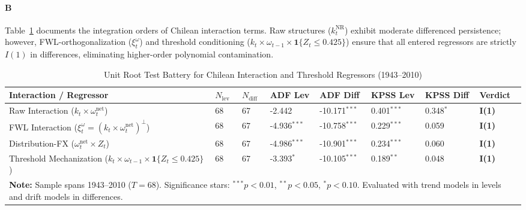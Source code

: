 \paragraph{B}
Table~\ref{tab:chile_urca_interactions} documents the integration orders of Chilean interaction terms. Raw structures ($k^{\text{NR}}_t$) exhibit moderate differenced persistence; however, FWL-orthogonalization ($\xi^{\omega}_t$) and threshold conditioning ($k_t \times \omega_{t-1} \times \mathbf{1}\{Z_t \le 0.425\}$) ensure that all entered regressors are strictly $I(1)$ in differences, eliminating higher-order polynomial contamination.

\begin{table}[h!]
\centering
\footnotesize
\setlength{\tabcolsep}{3pt}
\caption{Unit Root Test Battery for Chilean Interaction and Threshold Regressors (1943--2010)}
\label{tab:chile_urca_interactions}
\begin{tabular}{p{5.0cm} p{0.6cm} p{0.6cm} p{1.2cm} p{1.2cm} p{1.2cm} p{1.2cm} p{2.2cm}}
\toprule
\textbf{Interaction / Regressor} & \textbf{$N_{\text{lev}}$} & \textbf{$N_{\text{diff}}$} & \textbf{ADF Lev} & \textbf{ADF Diff} & \textbf{KPSS Lev} & \textbf{KPSS Diff} & \textbf{Verdict} \\
\midrule
Raw Interaction ($k_t \times \omega^{\text{net}}_t$) & 68 & 67 & -2.442 & -10.171$^{***}$ & 0.401$^{***}$ & 0.348$^{*}$ & \textbf{I(1)} \\
FWL Interaction ($\xi^{\omega}_t = (k_t \times \omega^{\text{net}}_t)^{\perp}$) & 68 & 67 & -4.936$^{***}$ & -10.758$^{***}$ & 0.229$^{***}$ & 0.059 & \textbf{I(1)} \\
Distribution-FX ($\omega^{\text{net}}_t \times Z_t$) & 68 & 67 & -4.986$^{***}$ & -10.901$^{***}$ & 0.234$^{***}$ & 0.060 & \textbf{I(1)} \\
Threshold Mechanization ($k_t \times \omega_{t-1} \times \mathbf{1}\{Z_t \le 0.425\}$) & 68 & 67 & -3.393$^{*}$ & -10.105$^{***}$ & 0.189$^{**}$ & 0.048 & \textbf{I(1)} \\
\bottomrule
\multicolumn{8}{p{14.5cm}}{\footnotesize \textbf{Note:} Sample spans 1943--2010 ($T=68$). Significance stars: $^{***} p < 0.01$, $^{**} p < 0.05$, $^{*} p < 0.10$. Evaluated with trend models in levels and drift models in differences.}
\end{tabular}
\end{table}
